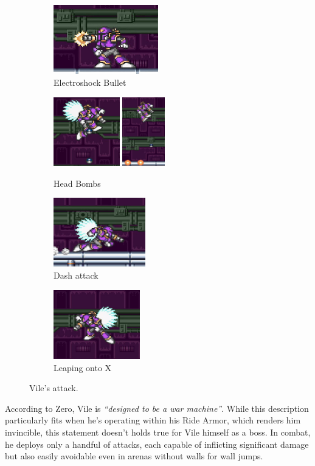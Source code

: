 \begin{figure}[htp]
	\centering
	\begin{subfigure}[t]{0.4\linewidth}
		\centering
		\includegraphics[height=3cm]{figures/X1/Sigma_stages/Vile_cannon_1.jpg}
		\caption{Electroshock Bullet }
	\end{subfigure}
	\begin{subfigure}[t]{0.4\linewidth}
		\centering
		\includegraphics[height=3cm]{figures/X1/Sigma_stages/Vile_bomb_1.jpg}
		\includegraphics[height=3cm]{figures/X1/Sigma_stages/Vile_bomb_2.jpg}
		\caption{Head Bombs}
	\end{subfigure}
	\begin{subfigure}[t]{0.35\linewidth}
		\centering
		\includegraphics[height=3cm]{figures/X1/Sigma_stages/Vile_dash.jpg}
		\caption{Dash attack}
	\end{subfigure}
	\begin{subfigure}[t]{0.35\linewidth}
		\centering
		\includegraphics[height=3cm]{figures/X1/Sigma_stages/Vile_leap.jpg}
		\caption{Leaping onto X}
	\end{subfigure}
	\caption{Vile's attack.}
\end{figure} 
According to Zero, Vile is \emph{``designed to be a war machine''}. While this description particularly fits when he's operating within his Ride Armor, which renders him invincible, this statement doesn't holds true for Vile himself as a boss. In combat, he deploys only a handful of attacks, each capable of inflicting significant damage but also easily avoidable even in arenas without walls for wall jumps. 

